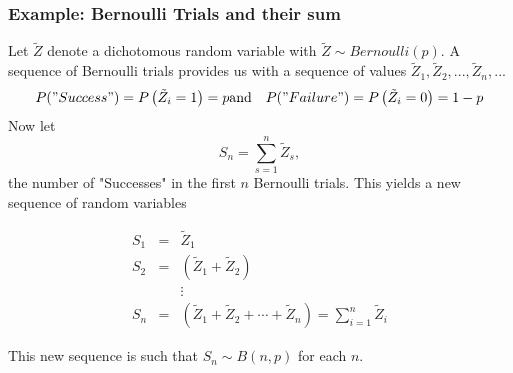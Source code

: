 \documentclass[notes=show,smaller,handout]{beamer}\usepackage[]{graphicx}\usepackage[]{color}
\renewcommand{\Pr}{P}
\begin{document}
\begin{frame}%

\frametitle{Example: Bernoulli Trials and their sum}


Let $\tilde Z$ denote a dichotomous random variable with $\tilde Z\sim Bernoulli(p)$. A sequence of Bernoulli trials provides us with a sequence of values $\tilde Z_{1},\tilde Z_{2},...,\tilde Z_{n},...$ %
\begin{eqnarray*}
\Pr("Success")=\Pr \left( \tilde Z_{i}=1\right) = p & \text{and} & \Pr("Failure")=\Pr \left( \tilde Z_{i}=0\right)  = 1-p
\end{eqnarray*}
Now let
$$S_n=\sum_{s=1}^n \tilde Z_s,$$ the number of "Successes" in the first $n$ Bernoulli trials. This yields a new sequence of random variables
\begin{small}
\begin{eqnarray*}
S_{1} &=& \tilde Z_{1} \\
S_{2} &=&\left( \tilde Z_{1}+ \tilde Z_{2}\right)\\
&&\vdots  \\
S_{n} &=&\left( \tilde Z_{1}+ \tilde Z_{2}+\cdots + \tilde Z_{n}\right) = \sum_{i=1}^n \tilde Z_i
\end{eqnarray*}
\end{small}
This new sequence is such that $S_n\sim B(n,p)$ for each $n$.

\end{frame}%
\end{document}
